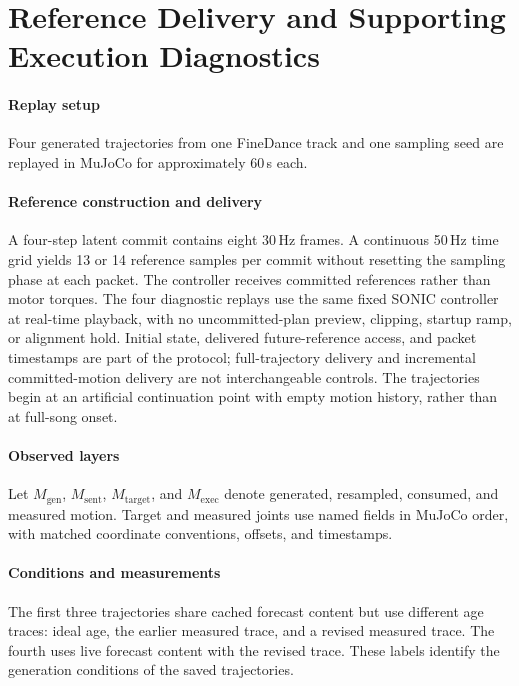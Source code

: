 \section{Reference Delivery and Supporting Execution Diagnostics}
\label{app:execution}
\paragraph{Replay setup}
Four generated trajectories from one FineDance track and one sampling seed
are replayed in MuJoCo for approximately 60\,s each.

\paragraph{Reference construction and delivery}
A four-step latent commit contains eight 30\,Hz frames. A continuous 50\,Hz time grid yields 13 or 14 reference samples per commit without resetting the sampling phase at each packet. The controller receives committed references rather than motor torques. The four diagnostic replays use the same fixed SONIC controller at real-time playback, with no uncommitted-plan preview, clipping, startup ramp, or alignment hold. Initial state, delivered future-reference access, and packet timestamps are part of the protocol; full-trajectory delivery and incremental committed-motion delivery are not interchangeable controls. The trajectories begin at an artificial continuation point with empty motion history, rather than at full-song onset.

\paragraph{Observed layers}
Let $M_{\mathrm{gen}}$, $M_{\mathrm{sent}}$, $M_{\mathrm{target}}$, and
$M_{\mathrm{exec}}$ denote generated, resampled, consumed, and measured motion.
Target and measured joints use named fields in MuJoCo order, with matched
coordinate conventions, offsets, and timestamps.

\paragraph{Conditions and measurements}
The first three trajectories share cached forecast content but use different
age traces: ideal age, the earlier measured trace, and a revised measured trace.
The fourth uses live forecast content with the revised trace. These labels
identify the generation conditions of the saved trajectories.

